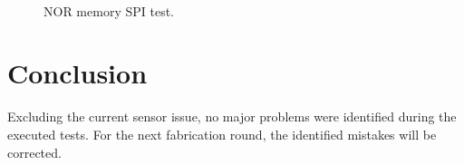 \begin{figure}[!htb]
    \begin{center}
        ~
        \caption{NOR memory SPI test.}
        \label{fig:test-nor-memory}
    \end{center}
\end{figure}

%

\section{Conclusion}

Excluding the current sensor issue, no major problems were identified during the executed tests. For the next fabrication round, the identified mistakes will be corrected.
